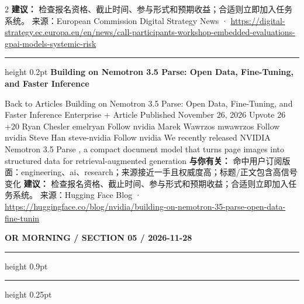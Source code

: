 \documentclass[10.5pt]{ctexart}
\begin{document}
\begin{multicols}{2}
\textbf{建议：} 检查报名资格、截止时间、参与形式和预期收益；合适则立即加入任务系统。
{\footnotesize\color{ormuted} 来源：European Commission Digital Strategy News · \url{https://digital-strategy.ec.europa.eu/en/news/call-participants-workshop-embedded-evaluations-gpai-models-systemic-risk}}
\vspace{2mm}
\hrule height 0.2pt
\vspace{2mm}
{\large\bfseries Building on Nemotron 3.5 Parse: Open Data, Fine-Tuning, and Faster Inference}\par
Back to Articles Building on Nemotron 3.5 Parse: Open Data, Fine-Tuning, and Faster Inference Enterprise + Article Published November 26, 2026 Upvote 26 +20 Ryan Chesler emelryan Follow nvidia Marek Wawrzos mwawrzos Follow nvidia Steve Han steve-nvidia Follow nvidia We recently released NVIDIA Nemotron 3.5 Parse , a compact document model that turns page images into structured data for retrieval-augmented generation 
\textbf{与你有关：} 命中用户订阅版面：engineering、ai、research；来源接近一手且权威度高；标题/正文包含高信号变化
\textbf{建议：} 检查报名资格、截止时间、参与形式和预期收益；合适则立即加入任务系统。
{\footnotesize\color{ormuted} 来源：Hugging Face Blog · \url{https://huggingface.co/blog/nvidia/building-on-nemotron-35-parse-open-data-fine-tunin}}
\end{multicols}
\newpage
{\small\bfseries OR MORNING / SECTION 05 / 2026-11-28}
\vspace{2mm}
\hrule height 0.9pt
\vspace{1.5mm}
\hrule height 0.25pt
\vspace{4mm}
\end{document}
